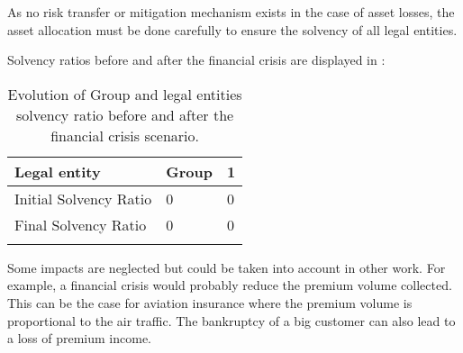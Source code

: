 As no risk transfer or mitigation mechanism exists in the case of asset losses, the asset allocation must be done carefully to ensure the solvency of all legal entities.

Solvency ratios before and after the financial crisis are displayed in :


\begin{table}
\centering
\begin{tabular}{|l|l|l|}
\hline
   \textbf{Legal entity} & \textbf{Group} & \textbf{1} \\ \hline \hline
   Initial Solvency Ratio & 0 & 0 \\ \hline
   Final Solvency Ratio & 0 & 0 \\ \hline
   \label{t:FC_SR}
\end{tabular}
   \caption{Evolution of Group and legal entities solvency ratio before and after the financial crisis scenario.}
\end{table}




Some impacts are neglected but could be taken into account in other work. For example, a financial crisis would probably reduce the premium volume collected. This can be the case for aviation insurance where the premium volume is proportional to the air traffic. The bankruptcy of a big customer can also lead to a loss of premium income.

